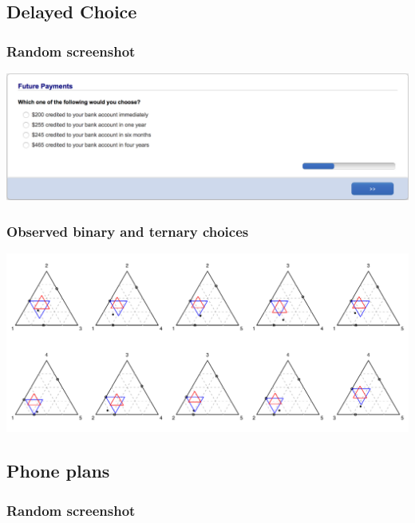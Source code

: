\documentclass[11pt,letter]{article}
\begin{document}
\pagebreak

\subsection{Delayed Choice}



\subsubsection*{Random screenshot}

\includegraphics[width=15cm]{Population_study_design/screenshot_Future_Payments.png}

\subsubsection*{Observed binary and ternary choices}

\includegraphics[width=15cm]{./Population_study_data/Simplexes/Future_payments.pdf}

\pagebreak

\subsection{Phone plans}



\subsubsection*{Random screenshot}
\end{document}
